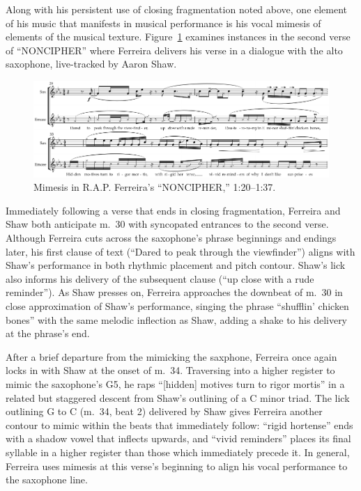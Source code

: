 Along with his persistent use of closing fragmentation noted above, one element of his music that
manifests in musical performance is his vocal mimesis of elements of the musical texture. 
Figure~\ref{fig:rorymimesis} examines instances in the second verse of ``NONCIPHER'' where Ferreira
delivers his verse in a dialogue with the alto saxophone, live-tracked by Aaron Shaw.
    \begin{figure}[!t]
        \centering
        \includegraphics{images/figures/chp 03/120137nonciphermimesis.pdf}
        \caption{Mimesis in R.A.P. Ferreira's ``NONCIPHER,'' 1:20--1:37.}
        \label{fig:rorymimesis}
    \end{figure}
Immediately following a verse that ends in closing fragmentation, Ferreira and Shaw both anticipate
m.~30 with syncopated entrances to the second verse. Although Ferreira cuts across the saxophone's 
phrase beginnings and endings later, his first clause of text (``Dared to peak through the viewfinder'')
aligns with Shaw's performance in both rhythmic placement and pitch contour. Shaw's lick also informs
his delivery of the subsequent clause (``up close with a rude reminder''). As Shaw presses on, 
Ferreira approaches the downbeat of m.~30 in close approximation of Shaw's performance, singing the 
phrase ``shufflin' chicken bones'' with the same melodic inflection as Shaw, adding a shake to his 
delivery at the phrase's end.

After a brief departure from the mimicking the saxphone, Ferreira once again locks in with Shaw at
the onset of m.~34. Traversing into a higher register to mimic the saxophone's G5, he raps ``[hidden]
motives turn to rigor mortis'' in a related but staggered descent from Shaw's outlining of a C minor
triad. The lick outlining G to C (m.~34, beat 2) delivered by Shaw gives Ferreira another contour
to mimic within the beats that immediately follow: ``rigid hortense'' ends with a shadow vowel that
inflects upwards, and ``vivid reminders'' places its final syllable in a higher register than those
which immediately precede it. In general, Ferreira uses mimesis at this verse's beginning to align 
his vocal performance to  the saxophone line.

